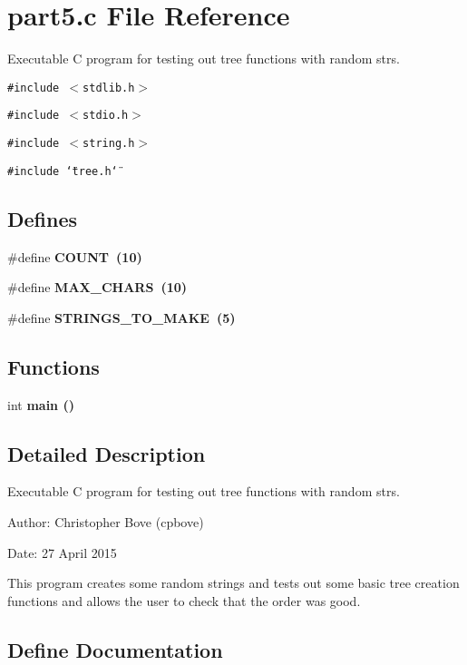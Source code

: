 \section{part5.c File Reference}
\label{part5_8c}
Executable C program for testing out tree functions with random strs. 

{\tt \#include $<$stdlib.h$>$}\par
{\tt \#include $<$stdio.h$>$}\par
{\tt \#include $<$string.h$>$}\par
{\tt \#include \char`\"{}tree.h\char`\"{}}\par
\subsection*{Defines}
\begin{CompactItemize}
\item 
\#define \bf{COUNT}~(10)
\item 
\#define \bf{MAX\_\-CHARS}~(10)
\item 
\#define \bf{STRINGS\_\-TO\_\-MAKE}~(5)
\end{CompactItemize}
\subsection*{Functions}
\begin{CompactItemize}
\item 
int \bf{main} ()
\end{CompactItemize}


\subsection{Detailed Description}
Executable C program for testing out tree functions with random strs. 

\begin{Desc}
\item[Author:]Christopher Bove (cpbove) \end{Desc}
\begin{Desc}
\item[Date:]27 April 2015\end{Desc}
This program creates some random strings and tests out some basic tree creation functions and allows the user to check that the order was good. 

\subsection{Define Documentation}

